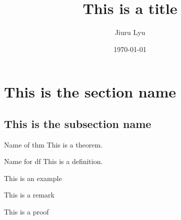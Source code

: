 

\title{\textbf{This is a title}}
\author{Jiuru Lyu}
\date{\today}


\maketitle

\tableofcontents

\section{This is the section name}
\subsection{This is the subsection name}

\begin{thm}{Name of thm}
	This is a theorem. 
\end{thm}
\begin{thm*}
	
\end{thm*}

\begin{df}{Name for df}
	This is a definition. 
\end{df}
\begin{df*}
	
\end{df*}

\begin{eg}{}
	This is an example
	\begin{sol}
		
	\end{sol}
	\begin{sol*}
		
	\end{sol*}
\end{eg}

\begin{rmk}
	This is a remark
\end{rmk}

\begin{prf}
	This is a proof
\end{prf}
\begin{prf*}
	
\end{prf*}
\begin{dis}
	
\end{dis}
\begin{dis*}
	
\end{dis*}

